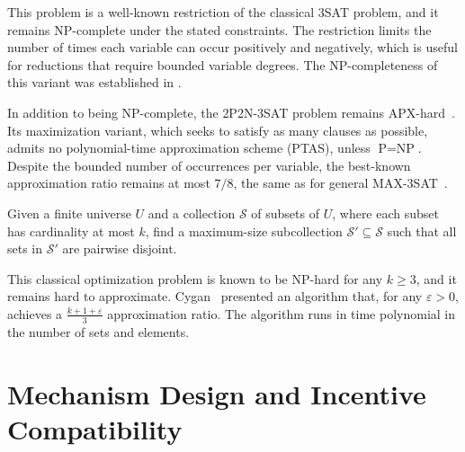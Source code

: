 This problem is a well-known restriction of the classical \textsc{3SAT} problem, and it remains NP-complete under the stated constraints. The restriction limits the number of times each variable can occur positively and negatively, which is useful for reductions that require bounded variable degrees. The NP-completeness of this variant was established in \cite{berman2004approximation}.

In addition to being NP-complete, the \textsc{2P2N-3SAT} problem remains APX-hard~\cite{berman2004approximation}. Its maximization variant, which seeks to satisfy as many clauses as possible, admits no polynomial-time approximation scheme (PTAS), unless $\text{P} = \text{NP}$. Despite the bounded number of occurrences per variable, the best-known approximation ratio remains at most $7/8$, the same as for general \textsc{MAX-3SAT}~\cite{hastad2001optimal}.


\begin{problem}
\label{prob:k_set_packing}

Given a finite universe $U$ and a collection $\mathcal{S}$ of subsets of $U$, where each subset has cardinality at most $k$, find a maximum-size subcollection $\mathcal{S}' \subseteq \mathcal{S}$ such that all sets in $\mathcal{S}'$ are pairwise disjoint.
\end{problem}

This classical optimization problem is known to be NP-hard for any $k \geq 3$, and it remains hard to approximate. Cygan~\cite{cygan2013improved} presented an algorithm that, for any $\varepsilon > 0$, achieves a $\frac{k + 1 + \varepsilon}{3}$ approximation ratio. The algorithm runs in time polynomial in the number of sets and elements.





\section{Mechanism Design and Incentive Compatibility}

